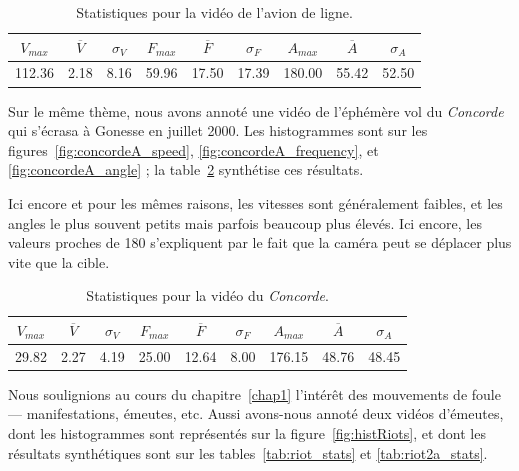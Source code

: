 \begin{table}
	\centering
	\begin{tabular}{c c c c c c c c c}
		$V_{max}$	& $\overline{V}$	& $\sigma_{V}$	& $F_{max}$	& $\overline{F}$	& $\sigma_{F}$	& $A_{max}$	& $\overline{A}$	& $\sigma_{A}$	\bigstrut[b] \\ \hline

		112.36		& 2.18				& 8.16			& 59.96		& 17.50				& 17.39			& 180.00	& 55.42				& 52.50			\bigstrut[t] \\
	\end{tabular}
	\caption[Statistiques pour de l'avion de ligne]{Statistiques pour la vidéo de l'avion de ligne.}
	\label{tab:chinaA_stats}
\end{table}

	Sur le même thème, nous avons annoté une vidéo de l'éphémère vol du \emph{Concorde} qui s'écrasa à Gonesse en juillet 2000\footnotemark{}. Les histogrammes sont sur les figures~\ref{fig:concordeA_speed}, \ref{fig:concordeA_frequency}, et \ref{fig:concordeA_angle} ; la table~\ref{tab:concordeA_stats} synthétise ces résultats.
	
	Ici encore et pour les mêmes raisons, les vitesses sont généralement faibles, et les angles le plus souvent petits mais parfois beaucoup plus élevés. Ici encore, les valeurs proches de 180\textdegree{} s'expliquent par le fait que la caméra peut se déplacer plus vite que la cible.	
	

\begin{table}
	\centering
	\begin{tabular}{c c c c c c c c c}
		$V_{max}$	& $\overline{V}$	& $\sigma_{V}$	& $F_{max}$	& $\overline{F}$	& $\sigma_{F}$	& $A_{max}$	& $\overline{A}$	& $\sigma_{A}$	\bigstrut[b] \\ \hline

		29.82		& 2.27				& 4.19			& 25.00		& 12.64				& 8.00			& 176.15	& 48.76				& 48.45			\bigstrut[t] \\
	\end{tabular}
	\caption[Statistiques pour la vidéo du \emph{Concorde}]{Statistiques pour la vidéo du \emph{Concorde}.}
	\label{tab:concordeA_stats}
\end{table}

	Nous soulignions au cours du chapitre~\ref{chap1} l'intérêt des mouvements de foule --- manifestations, émeutes, etc. Aussi avons-nous annoté deux vidéos d'émeutes, dont les histogrammes sont représentés sur la figure~\ref{fig:histRiots}, et dont les résultats synthétiques sont sur les tables~\ref{tab:riot_stats} et \ref{tab:riot2a_stats}.


